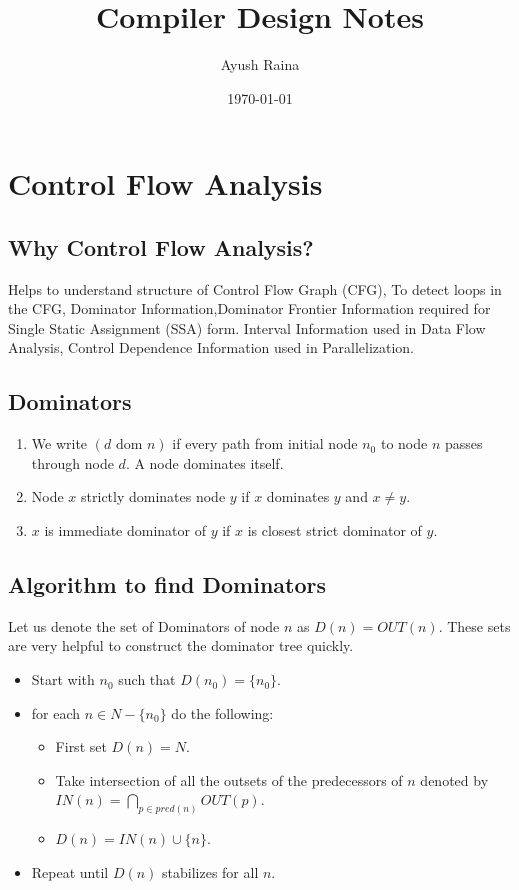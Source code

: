 \documentclass{article}
\title{Compiler Design Notes}
\author{Ayush Raina}
\date{\today}
\begin{document}
 

\maketitle

\section*{Control Flow Analysis}
\subsection*{Why Control Flow Analysis?}
Helps to understand structure of Control Flow Graph (CFG), To detect loops in the CFG, Dominator Information,Dominator Frontier Information required for Single Static Assignment (SSA) form. Interval Information used in Data Flow Analysis, Control Dependence Information used in Parallelization.

\subsection*{Dominators}
\begin{enumerate}
    \item We write $(d \text{ dom } n)$ if every path from initial node $n_0$ to node $n$ passes through node $d$. A node dominates itself.
    \item Node $x$ strictly dominates node $y$ if $x$ dominates $y$ and $x \neq y$.
    \item $x$ is immediate dominator of $y$ if $x$ is closest strict dominator of $y$.
\end{enumerate}

\subsection*{Algorithm to find Dominators}
Let us denote the set of Dominators of node $n$ as $D(n) = OUT(n)$. These sets are very helpful to construct the dominator tree quickly. 
\begin{itemize}
    \item Start with $n_0$ such that $D(n_0) = \{n_0\}$.
    \item for each $n \in N - \{n_0\}$ do the following:
    \begin{itemize}
        \item First set $D(n) = N$.
        \item Take intersection of all the outsets of the predecessors of $n$ denoted by $IN(n) = \bigcap_{p \in pred(n)} OUT(p)$.
        \item $D(n) = IN(n) \cup \{n\}$.
    \end{itemize}

    \item Repeat until $D(n)$ stabilizes for all $n$.
\end{itemize}
\end{document}
